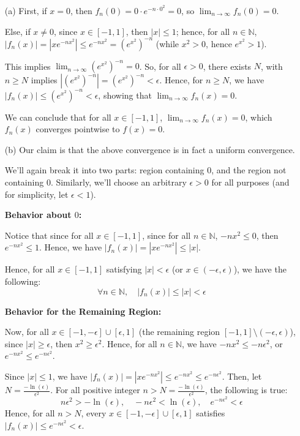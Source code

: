 \documentclass{article}
\begin{document}
\begin{itemize}
    \item[(a)] First, if $x=0$, then $f_n(0) = 0\cdot e^{-n\cdot 0^2}=0$, so $\lim_{n\rightarrow\infty}f_n(0)=0$.
    
    \hfill
    
    Else, if $x\neq 0$, since $x\in[-1,1]$, then $|x|\leq 1$; hence, for all $n\in\mathbb{N}$, $|f_n(x)| = |xe^{-nx^2}| \leq e^{-nx^2} = (e^{x^2})^{-n}$ (while $x^2>0$, hence $e^{x^2}>1$).

    This implies $\lim_{n\rightarrow\infty}(e^{x^2})^{-n}=0$. So, for all $\epsilon>0$, there exists $N$, with $n\geq N$ implies $|(e^{x^2})^{-n}| = (e^{x^2})^{-n}<\epsilon$. Hence, for $n\geq N$,
    we have $|f_n(x)| \leq (e^{x^2})^{-n}<\epsilon$, showing that $\lim_{n\rightarrow\infty}f_n(x)=0$.

    We can conclude that for all $x\in[-1,1]$, $\lim_{n\rightarrow\infty}f_n(x)=0$, which $f_n(x)$ converges pointwise to $f(x)=0$.
    
    \hfill

    \item[(b)] Our claim is that the above convergence is in fact a uniform convergence.
    
    We'll again break it into two parts: region containing $0$, and the region not containing $0$.
    Similarly, we'll choose an arbitrary $\epsilon>0$ for all purposes (and for simplicity, let $\epsilon<1$).

    \textbf{Behavior about $0$:}
    
    Notice that since for all $x\in [-1,1]$, since for all $n\in\mathbb{N}$, $-nx^2\leq 0$, then $e^{-nx^2}\leq 1$. Hence, we have $|f_n(x)|=|xe^{-nx^2}|\leq |x|$.

    Hence, for all $x\in[-1,1]$ satisfying $|x|<\epsilon$ (or $x\in (-\epsilon,\epsilon)$), we have the following:
    $$\forall n\in\mathbb{N},\quad |f_n(x)|\leq |x|<\epsilon$$

    \textbf{Behavior for the Remaining Region:}

    Now, for all $x\in [-1,-\epsilon]\cup [\epsilon,1]$ (the remaining region $[-1,1]\setminus (-\epsilon,\epsilon)$), since $|x|\geq \epsilon$, then $x^2\geq \epsilon^2$.
    Hence, for all $n\in\mathbb{N}$, we have $-nx^2\leq -n\epsilon^2$, or $e^{-nx^2}\leq e^{-n\epsilon^2}$.

    Since $|x|\leq 1$, we have $|f_n(x)| = |xe^{-nx^2}| \leq e^{-nx^2}\leq e^{-n\epsilon^2}$. Then, let $N=\frac{-\ln(\epsilon)}{\epsilon^2}$. For all positive integer $n>N=\frac{-\ln(\epsilon)}{\epsilon^2}$, the following is true:
    $$n\epsilon^2 > -\ln(\epsilon),\quad -n\epsilon^2<\ln(\epsilon),\quad e^{-n\epsilon^2}<\epsilon$$
    Hence, for all $n>N$, every $x\in [-1,-\epsilon]\cup [\epsilon,1]$ satisfies $|f_n(x)| \leq e^{-n\epsilon^2}<\epsilon$.


\end{itemize}
\end{document}
